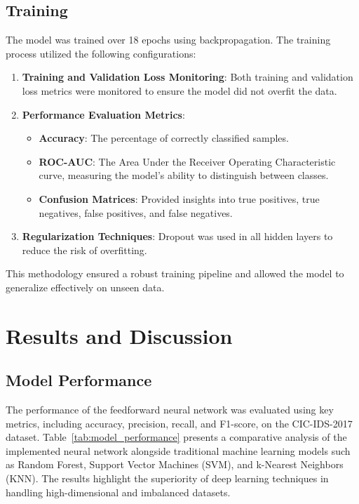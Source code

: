 \documentclass[conference]{IEEEtran}
\begin{document}
\subsection{Training}
The model was trained over 18 epochs using backpropagation. The training process utilized the following configurations:
\begin{enumerate}[label=\roman*)]
    \item \textbf{Training and Validation Loss Monitoring}: Both training and validation loss metrics were monitored to ensure the model did not overfit the data.
    \item \textbf{Performance Evaluation Metrics}:
    \begin{itemize}
        \item \textbf{Accuracy}: The percentage of correctly classified samples.
        \item \textbf{ROC-AUC}: The Area Under the Receiver Operating Characteristic curve, measuring the model's ability to distinguish between classes.
        \item \textbf{Confusion Matrices}: Provided insights into true positives, true negatives, false positives, and false negatives.
    \end{itemize}
    \item \textbf{Regularization Techniques}: Dropout was used in all hidden layers to reduce the risk of overfitting.
\end{enumerate}

This methodology ensured a robust training pipeline and allowed the model to generalize effectively on unseen data.


\section{Results and Discussion}

\subsection{Model Performance}
The performance of the feedforward neural network was evaluated using key metrics, including accuracy, precision, recall, and F1-score, on the CIC-IDS-2017 dataset. Table~\ref{tab:model_performance} presents a comparative analysis of the implemented neural network alongside traditional machine learning models such as Random Forest, Support Vector Machines (SVM), and k-Nearest Neighbors (KNN). The results highlight the superiority of deep learning techniques in handling high-dimensional and imbalanced datasets.
\end{document}
